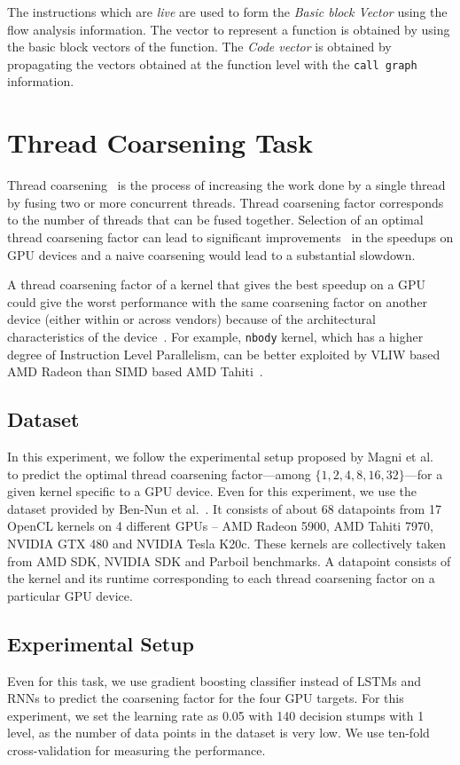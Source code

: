 The instructions which are \textit{live} are used to form the \textit{Basic block Vector}  using the flow analysis information. The vector to represent a function is obtained by using the basic block vectors of the function. The \textit{Code vector} is obtained by propagating the vectors obtained at the function level with the \texttt{call graph} information.
\section{Thread Coarsening Task}
Thread coarsening~\cite{Volkov-Demmel-10.5555/1413370.1413402} is the process of increasing the work done by a single thread by fusing two or more concurrent threads. Thread coarsening factor corresponds to the number of threads that can be fused together. Selection of an optimal thread coarsening factor can lead to significant improvements~\cite{Magni-SC13-DBLP:conf/sc/MagniDO13} in the speedups on GPU devices and a naive coarsening would lead to a substantial slowdown.

A thread coarsening factor of a kernel that gives the best speedup on a GPU could give the worst performance with the same coarsening factor on another device (either within or across vendors) because of the architectural characteristics of the device~\cite{magni2014automatic, Stawinoga-10.1145/3194242}. For example, \texttt{nbody} kernel, which has a higher degree of Instruction Level Parallelism, can be better exploited by VLIW based AMD Radeon than SIMD based AMD Tahiti~\cite{magni2014automatic}.

\subsection{Dataset} 
In this experiment, we follow the experimental setup proposed by Magni et al.~\cite{magni2014automatic} to predict the optimal thread coarsening factor---among $\{1,2,4,8,16,32\}$---for a given kernel specific to a GPU device. Even for this experiment, we use the dataset provided by Ben-Nun et al.~\cite{ncc}. It consists of about 68 datapoints from 17 OpenCL kernels on 4 different GPUs -- AMD Radeon 5900, AMD Tahiti 7970, NVIDIA GTX 480 and NVIDIA Tesla K20c.
These kernels are collectively taken from AMD SDK, NVIDIA SDK and Parboil benchmarks.
A datapoint consists of the kernel and its runtime corresponding to each thread coarsening factor on a particular GPU device.

\subsection{Experimental Setup}
Even for this task, we use gradient boosting classifier instead of LSTMs and RNNs to predict the coarsening factor for the four GPU targets. For this experiment, we set the learning rate as 0.05 with 140 decision stumps with 1 level, as the number of data points in the dataset is very low. We use ten-fold cross-validation for measuring the performance.

